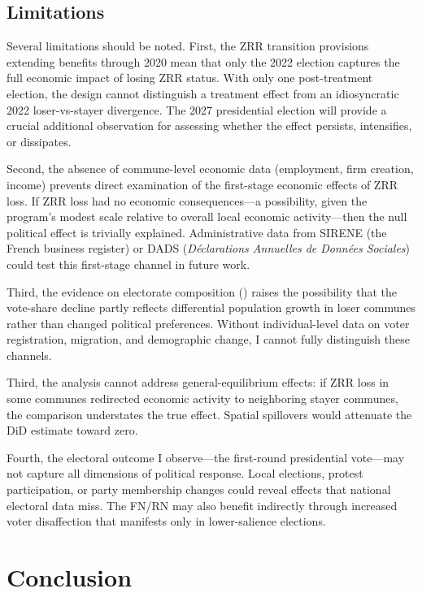 \documentclass[12pt]{article}
\begin{document}
\subsection{Limitations}

Several limitations should be noted. First, the ZRR transition provisions extending benefits through 2020 mean that only the 2022 election captures the full economic impact of losing ZRR status. With only one post-treatment election, the design cannot distinguish a treatment effect from an idiosyncratic 2022 loser-vs-stayer divergence. The 2027 presidential election will provide a crucial additional observation for assessing whether the effect persists, intensifies, or dissipates.

Second, the absence of commune-level economic data (employment, firm creation, income) prevents direct examination of the first-stage economic effects of ZRR loss. If ZRR loss had no economic consequences---a possibility, given the program's modest scale relative to overall local economic activity---then the null political effect is trivially explained. Administrative data from SIRENE (the French business register) or DADS (\textit{D\'{e}clarations Annuelles de Donn\'{e}es Sociales}) could test this first-stage channel in future work.

Third, the evidence on electorate composition () raises the possibility that the vote-share decline partly reflects differential population growth in loser communes rather than changed political preferences. Without individual-level data on voter registration, migration, and demographic change, I cannot fully distinguish these channels.

Third, the analysis cannot address general-equilibrium effects: if ZRR loss in some communes redirected economic activity to neighboring stayer communes, the comparison understates the true effect. Spatial spillovers would attenuate the DiD estimate toward zero.

Fourth, the electoral outcome I observe---the first-round presidential vote---may not capture all dimensions of political response. Local elections, protest participation, or party membership changes could reveal effects that national electoral data miss. The FN/RN may also benefit indirectly through increased voter disaffection that manifests only in lower-salience elections.


\section{Conclusion} \label{sec:conclusion}
\end{document}
